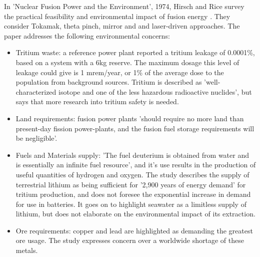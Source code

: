\label{sec:direct_imp}
In 'Nuclear Fusion Power and the Environment', 1974, Hirsch and Rice survey the practical feasibility and environmental impact of fusion energy \cite{hirsch1974nuclear}. They consider Tokamak, theta pinch, mirror and and laser-driven approaches. The paper addresses the following environmental concerns:
\begin{itemize}
    \item Tritium waste: a reference power plant reported a tritium leakage of 0.0001\%, based on a system with a 6kg reserve. The maximum dosage this level of leakage could give is 1 mrem/year, or 1\% of the average dose to the population from background sources. Tritium is described as 'well-characterized isotope and one of the less hazardous radioactive nuclides', but says that more research into tritium safety is needed.
    \item Land requirements: fusion power plants 'should require no more land than present-day fission power-plants, and the fusion fuel storage requirements will be negligible'.
    \item Fuels and Materials supply: 'The fuel deuterium is obtained from water and is
essentially an infinite fuel resource', and it's use results in the production of useful quantities of hydrogen and oxygen. The study describes the supply of terrestrial lithium as being sufficient for '2,900 years of energy demand' for tritium production, and does not foresee the exponential increase in demand for use in batteries. It goes on to highlight seawater as a limitless supply of lithium, but does not elaborate on the environmental impact of its extraction.
\item Ore requirements: copper and lead are highlighted as demanding the greatest ore usage. The study expresses concern over a worldwide shortage of these metals.
\end{itemize}

